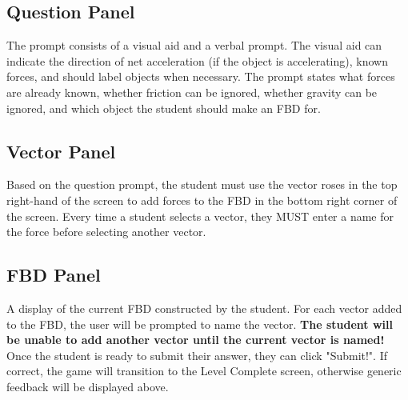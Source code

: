 \documentclass[12pt]{article}
\begin{document}
\subsection{Question Panel}
The prompt consists of a visual aid and a verbal prompt. The visual aid can indicate the direction of net acceleration (if the object is accelerating), known forces, and should label objects when necessary. The prompt states what forces are already known, whether friction can be ignored, whether gravity can be ignored, and which object the student should make an FBD for.\par

\subsection{Vector Panel}
Based on the question prompt, the student must use the vector roses in the top right-hand of the screen to add forces to the FBD in the bottom right corner of the screen. Every time a student selects a vector, they MUST enter a name for the force before selecting another vector.\par

\subsection{FBD Panel}
A display of the current FBD constructed by the student. For each vector added to the FBD, the user will be prompted to name the vector. \textbf{The student will be unable to add another vector until the current vector is named!} Once the student is ready to submit their answer, they can click "Submit!". If correct, the game will transition to the Level Complete screen, otherwise generic feedback will be displayed above.\par
\end{document}
